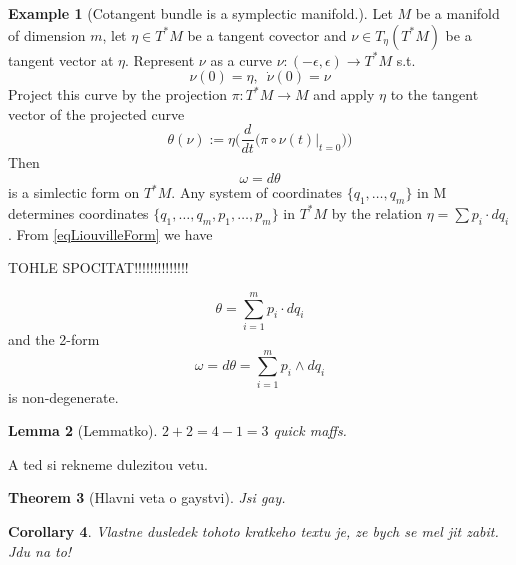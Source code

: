 \documentclass{article}
\newtheorem{theorem}{Theorem}
\newtheorem{lemma}[theorem]{Lemma} %
\newtheorem{corollary}[theorem]{Corollary}
\theoremstyle{definition}
\newtheorem{example}[theorem]{Example}
\begin{document}
\begin{example}[Cotangent bundle is a symplectic manifold.]
    Let $M$ be a manifold of dimension $m$, let $\eta \in T^*M$ be a tangent covector and $\nu \in T_\eta(T^*M)$ be a tangent vector at $\eta$.
    Represent $\nu$ as a curve $\nu:(-\epsilon, \epsilon) \rightarrow T^*M$ s.t. 
    \begin{equation*}
        \nu(0) = \eta,\,\,\, \dot{\nu}(0) = \nu
    \end{equation*}
    Project this curve by the projection $\pi:T^*M \rightarrow M$ and apply $\eta$ to the tangent vector of the projected curve 
    \begin{equation}\label{eqLiouvilleForm}
        \theta(\nu) := \eta \Big(\frac{d}{dt}\big(\pi \circ \nu(t)\vert_{t=0} \big)\Big)
    \end{equation}
    Then 
    \begin{equation*}
        \omega = d \theta
    \end{equation*}
    is a simlectic form on $T^*M$.
    Any system of coordinates $\{q_1,\dots, q_m\}$ in M determines coordinates $\{q_1,\dots, q_m, p_1, \dots, p_m\}$ in $T^*M$ by the relation
    $\eta = \sum p_i \cdot dq_i$. From \eqref{eqLiouvilleForm} we have 
    
    
    TOHLE SPOCITAT!!!!!!!!!!!!!!
    
    \begin{equation*}
        \theta = \sum_{i=1}^m p_i \cdot dq_i
    \end{equation*}
    and the 2-form
    \begin{equation*}
        \omega = d \theta = \sum_{i=1}^m p_i \wedge dq_i
    \end{equation*}
    is non-degenerate.


\end{example}

\begin{lemma}[Lemmatko]
$2+2 = 4 - 1 = 3$ quick maffs.
\end{lemma}

A ted si rekneme dulezitou vetu.
\begin{theorem}[Hlavni veta o gaystvi]
Jsi gay.
\end{theorem}


\begin{corollary}
    Vlastne dusledek tohoto kratkeho textu je, ze bych se mel jit zabit. Jdu na to!
\end{corollary}
\end{document}
